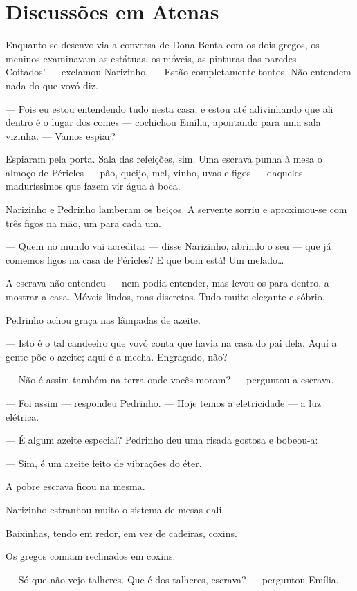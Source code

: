 \chapter{Discussões em Atenas}

Enquanto se desenvolvia a conversa de Dona Benta com os dois gregos, os
meninos examinavam as estátuas, os móveis, as pinturas das paredes. ---
Coitados! --- exclamou Narizinho. --- Estão completamente tontos. Não
entendem nada do que vovó diz.

--- Pois eu estou entendendo tudo nesta casa, e estou até adivinhando
que ali dentro é o lugar dos comes --- cochichou Emília, apontando para
uma sala vizinha. --- Vamos espiar?

Espiaram pela porta. Sala das refeições, sim. Uma escrava punha à mesa o
almoço de Péricles --- pão, queijo, mel, vinho, uvas e figos ---
daqueles maduríssimos que fazem vir água à boca.

Narizinho e Pedrinho lamberam os beiços. A servente sorriu e
aproximou-se com três figos na mão, um para cada um.

--- Quem no mundo vai acreditar --- disse Narizinho, abrindo o seu ---
que já comemos figos na casa de Péricles? E que bom está! Um
melado\ldots{}

A escrava não entendeu --- nem podia entender, mas levou-os para dentro,
a mostrar a casa. Móveis lindos, mas discretos. Tudo muito elegante e
sóbrio.

Pedrinho achou graça nas lâmpadas de azeite.

--- Isto é o tal candeeiro que vovó conta que havia na casa do pai dela.
Aqui a gente põe o azeite; aqui é a mecha. Engraçado, não?

--- Não é assim também na terra onde vocês moram? --- perguntou a
escrava.

--- Foi assim --- respondeu Pedrinho. --- Hoje temos a eletricidade ---
a luz elétrica.

--- É algum azeite especial? Pedrinho deu uma risada gostosa e bobeou-a:

--- Sim, é um azeite feito de vibrações do éter.

A pobre escrava ficou na mesma.

Narizinho estranhou muito o sistema de mesas dali.

Baixinhas, tendo em redor, em vez de cadeiras, coxins.

Os gregos comiam reclinados em coxins.

--- Só que não vejo talheres. Que é dos talheres, escrava? --- perguntou
Emília.

